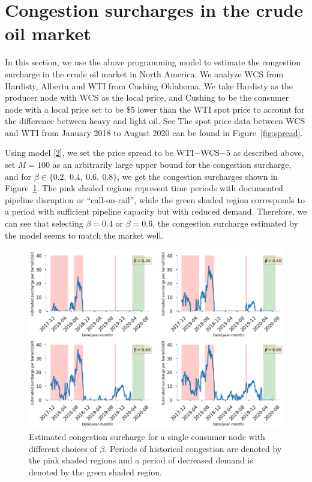 \documentclass[11pt]{m2pi}
\begin{document}
\section{Congestion surcharges in the crude oil market}
In this section, we use the above programming model to estimate the congestion surcharge in the crude oil market in North America. We analyze WCS from Hardisty, Alberta and WTI from Cushing Oklahoma. We take Hardisty as the producer node with WCS as the local price, and Cushing to be the consumer node with a local price set to be \$5 lower than the WTI spot price to account for the difference between heavy and light oil. See The spot price data between WCS and WTI from January 2018 to August 2020 can be found in Figure~\ref{fig:spread}. 




Using model \eqref{2}, we set the price spread to be WTI$-$WCS$-5$ as described above, set $M=100$ as an arbitrarily large upper bound for the congestion surcharge, and for $\beta \in \{0.2,~0.4,~0.6,~0.8\}$, we get the congestion surcharges shown in Figure~\ref{fig:Congestion Surcharge}. The pink shaded regions represent time periods with documented pipeline disruption or “call-on-rail”, while the green shaded region corresponds to a period with sufficient pipeline capacity but with reduced demand. Therefore, we can see that selecting $\beta=0.4$ or $\beta = 0.6$, the congestion surcharge estimated by the model seems to match the market well.
\begin{figure}[h!]
    \centering
    \includegraphics[width = \linewidth]{image8.png}
    \caption{Estimated congestion surcharge for a single consumer node with different choices of $\beta$. Periods of historical congestion are denoted by the pink shaded regions and a period of decreased demand is denoted by the green shaded region.}
    \label{fig:Congestion Surcharge}
\end{figure}
\end{document}
